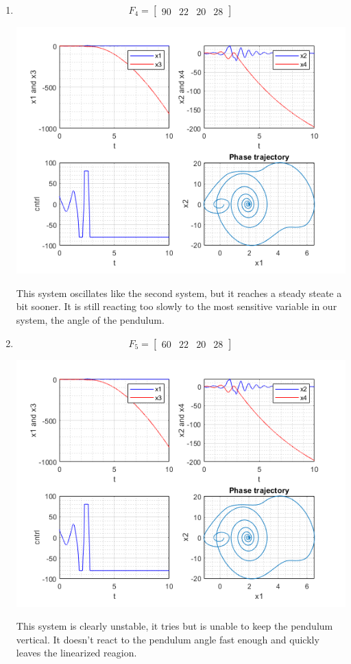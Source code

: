 \documentclass{article}
\begin{document}
\begin{enumerate}[1)]
\item$$ F_4 = \begin{bmatrix} 90 & 22 & 20 & 28 \end{bmatrix} $$
\begin{minipage}{\linewidth}
\centering
\includegraphics[scale=.8]{images/p2-4.png}
\end{minipage}
This system oscillates like the second system, but it reaches a steady steate a bit sooner.
It is still reacting too slowly to the most sensitive variable in our system, the angle of the pendulum.

\newpage
\item $$ F_5 = \begin{bmatrix} 60 & 22 & 20 & 28 \end{bmatrix} $$
\begin{minipage}{\linewidth}
\centering
\includegraphics[scale=.8]{images/p2-5.png}
\end{minipage}
This system is clearly unstable, it tries but is unable to keep the pendulum vertical.
It doesn't react to the pendulum angle fast enough and quickly leaves the linearized reagion.


\end{enumerate}
\end{document}
